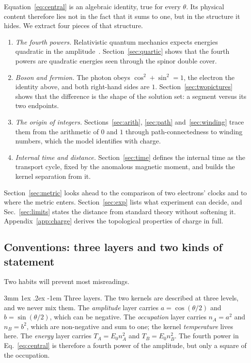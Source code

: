 \documentclass[%
 reprint, amsmath,amssymb, aps, prb, ]{revtex4-2}
\makeatletter
\numberwithin{equation}{section}
\renewcommand\paragraph{%
  \@startsection{paragraph}{4}{\z@}%
    {3mm \@plus 1ex \@minus .2ex}
    {-1em}
    {\normalfont\normalsize\itshape}}
\makeatother
\begin{document}
Equation~\eqref{eq:central} is an algebraic identity, true for every $\theta$. Its physical content therefore lies not in the fact that it sums to one, but in the structure it hides. We extract four pieces of that structure.
\begin{enumerate}[leftmargin=1.6em,itemsep=0.25em]
\item \emph{The fourth powers.} Relativistic quantum mechanics expects energies quadratic in the amplitude~\cite{ref:dirac28}. Section~\ref{sec:quartic} shows that the fourth powers are quadratic energies seen through the spinor double cover.
\item \emph{Boson and fermion.} The photon obeys $\cos^2+\sin^2=1$, the electron the identity above, and both right-hand sides are $1$. Section~\ref{sec:twopictures} shows that the difference is the shape of the solution set: a segment versus its two endpoints.
\item \emph{The origin of integers.} Sections~\ref{sec:arith}, \ref{sec:path} and~\ref{sec:winding} trace them from the arithmetic of $0$ and $1$ through path-connectedness to winding numbers, which the model identifies with charge.
\item \emph{Internal time and distance.} Section~\ref{sec:time} defines the internal time as the transport cycle, fixed by the anomalous magnetic moment, and builds the kernel separation from it.
\end{enumerate}
Section~\ref{sec:metric} looks ahead to the comparison of two electrons' clocks and to where the metric enters. Section~\ref{sec:exp} lists what experiment can decide, and Sec.~\ref{sec:limits} states the distance from standard theory without softening it. Appendix~\ref{app:charge} derives the topological properties of charge in full.

\subsection{Conventions: three layers and two kinds of statement}
\label{sec:conv}

Two habits will prevent most misreadings.

\paragraph{Three layers.} The two kernels are described at three levels, and we never mix them. The \emph{amplitude} layer carries $a=\cos(\theta/2)$ and $b=\sin(\theta/2)$, which can be negative. The \emph{occupation} layer carries $n_A=a^2$ and $n_B=b^2$, which are non-negative and sum to one; the kernel \emph{temperature} lives here. The \emph{energy} layer carries $T_A=E_0 n_A^2$ and $T_B=E_0 n_B^2$. The fourth power in Eq.~\eqref{eq:central} is therefore a fourth power of the amplitude, but only a square of the occupation.
\end{document}
